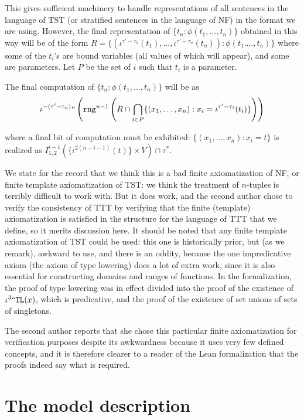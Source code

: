 \documentclass{article}
\newif\ifshowannotations
\newcommand{\abf}{\ifshowannotations\bf\fi}
\theoremstyle{definition}
\theoremstyle{remark}
\begin{document}
{This gives sufficient machinery to handle representations of all sentences in the language of TST (or stratified sentences in the language of NF) in the format we are using.  However, the final representation of  $\{t_n:\phi(t_1,\ldots,t_n)\}$ obtained in this way
will be of the form $R=\{(\iota^{\tau'-\tau_1}(t_1),\ldots,\iota^{\tau'-\tau_n}(t_n)):\phi(t_1.\ldots,t_n)\}$
where some of the $t_i$'s are bound variables (all values of which will appear), and some are parameters.  Let $P$ be the set  of $i$ such that
$t_i$ is a parameter.

The final computation of $\{t_n:\phi(t_1,\ldots,t_n)\}$ will be as
$$\iota^{-(\tau'-\tau_{n})}``\left({\tt rng}^{n-1}\left(R \cap \bigcap_{i \in P}\{(x_1,\ldots,x_n):x_i = \iota^{\tau'-\tau_i}(t_i)\}\right)\right)$$



where a final bit of computation must be exhibited:  $\{(x_1,\ldots,x_n):x_i = t\}$ is realized as
$I^{i-1}_{1,2}(\{\iota^{2(n-i-1)}(t)\}\times V)\cap \tau^*.$

We state for the record that we think this is a bad finite axiomatization of NF, or finite template axiomatization of TST:  we think the treatment of $n$-tuples is terribly difficult to work with.  But it does work, and the second author chose to verify the consistency of TTT by verifying that the finite (template) axiomatization is satisfied  in the structure for the language of TTT that we define, so it merits discussion here.  It should be noted that any finite template axiomatization of TST could be used: {\abf this one is historically prior, but (as we remark), awkward to use,} and there is an oddity, because the one impredicative axiom (the axiom of type lowering) does a lot of extra work, since it is also essential for constructing domains and ranges of functions.  In the formalization, the proof of type lowering was in effect divided into the proof of the existence of $\iota^3``{\tt TL}(x)$, which is predicative, and the proof of the existence of set unions of sets of singletons.

The second author reports that she chose this particular finite axiomatization for verification purposes despite its awkwardness because it uses very few defined concepts, and it is therefore clearer to a reader of the Lean formalization that the proofs indeed say what is required.



\newpage

\section{The model description}\label{s:model_description}


}
\end{document}
